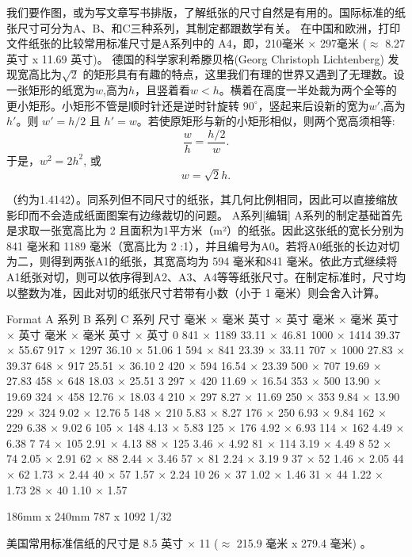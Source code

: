 \documentclass[main.tex]{subfiles}
\begin{document}
我们要作图，或为写文章写书排版，了解纸张的尺寸自然是有用的。国际标准的纸张尺寸可分为A、B、和C三种系列，其制定都跟数学有关。
在中国和欧洲，打印文件纸张的比较常用标准尺寸是A系列中的 A4，即，210毫米 × 297毫米 ($\approx$ 8.27 英寸 x 11.69 英寸)。
德国的科学家利希滕贝格(Georg Christoph Lichtenberg) 发现宽高比为$\sqrt{2}$
的矩形具有有趣的特点，这里我们有理的世界又遇到了无理数。设一张矩形的纸宽为$w$,高为$h$，且竖着看$w <h$。横着在高度一半处裁为两个全等的更小矩形。小矩形不管是顺时针还是逆时针旋转 $90^\circ$，竖起来后设新的宽为$w'$,高为$h'$。则
$w' = h/2$ 且 $h' = w$。若使原矩形与新的小矩形相似，则两个宽高须相等:
$$\frac{w}{h} = \frac{h/2}{w}.   $$
于是，$w^2= 2 h^2$, 或
 $$w= \sqrt{2} h.$$
 
（约为1.4142）。同系列但不同尺寸的纸张，其几何比例相同，因此可以直接缩放影印而不会造成纸面图案有边缘裁切的问题。
A系列[编辑]
A系列的制定基础首先是求取一张宽高比为
2
且面积为1平方米（m²）的纸张。因此这张纸的宽长分别为 841 毫米和 1189 毫米（宽高比为
2
:1），并且编号为A0。若将A0纸张的长边对切为二，则得到两张A1的纸张，其宽高均为 594 毫米和841 毫米。依此方式继续将A1纸张对切，则可以依序得到A2、A3、A4等等纸张尺寸。在制定标准时，尺寸均以整数为准，因此对切的纸张尺寸若带有小数（小于 1 毫米）则会舍入计算。

Format	A 系列	B 系列	C 系列
尺寸	毫米 × 毫米	英寸 × 英寸	毫米 × 毫米	英寸 × 英寸	毫米 × 毫米	英寸 × 英寸
0	841 × 1189	33.11 × 46.81	1000 × 1414	39.37 × 55.67	917 × 1297	36.10 × 51.06
1	594 × 841	23.39 × 33.11	707 × 1000	27.83 × 39.37	648 × 917	25.51 × 36.10
2	420 × 594	16.54 × 23.39	500 × 707	19.69 × 27.83	458 × 648	18.03 × 25.51
3	297 × 420	11.69 × 16.54	353 × 500	13.90 × 19.69	324 × 458	12.76 × 18.03
4	210 × 297	8.27 × 11.69	250 × 353	9.84 × 13.90	229 × 324	9.02 × 12.76
5	148 × 210	5.83 × 8.27	176 × 250	6.93 × 9.84	162 × 229	6.38 × 9.02
6	105 × 148	4.13 × 5.83	125 × 176	4.92 × 6.93	114 × 162	4.49 × 6.38
7	74 × 105	2.91 × 4.13	88 × 125	3.46 × 4.92	81 × 114	3.19 × 4.49
8	52 × 74	2.05 × 2.91	62 × 88	2.44 × 3.46	57 × 81	2.24 × 3.19
9	37 × 52	1.46 × 2.05	44 × 62	1.73 × 2.44	40 × 57	1.57 × 2.24
10	26 × 37	1.02 × 1.46	31 × 44	1.22 × 1.73	28 × 40	1.10 × 1.57


186mm x 240mm
787 x 1092 1/32 


美国常用标准信纸的尺寸是 8.5 英寸 × 11 ($\approx$ 215.9 毫米 x 279.4 毫米) 。
\newpage
\end{document}
